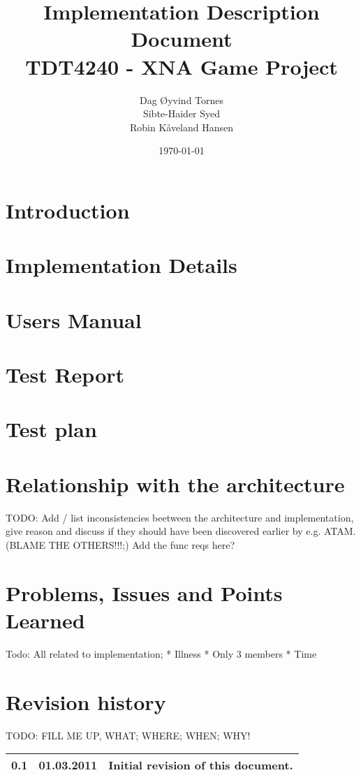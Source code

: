 \documentclass[titlepage,a4paper,11pt]{article}
\date{\today}
\begin{document}
\title{Implementation Description Document\\
 		TDT4240 - XNA Game Project}

\author{Dag Øyvind Tornes\\
 		Sibte-Haider Syed\\ 
		Robin Kåveland Hansen\\}
\maketitle

\pagestyle{empty}
\tableofcontents
\clearpage
\pagestyle{plain}

\section{Introduction}
	

\section{Implementation Details}
	
	
\section{Users Manual}
	
	
\section{Test Report}
	

\section{Test plan}
	
	
\section{Relationship with the architecture}
	TODO: Add / list inconsistencies beetween the architecture and implementation, give reason and discuss if they should
	have been discovered earlier by e.g. ATAM. (BLAME THE OTHERS!!!;)
	Add the func reqs here?
	
	
\section{Problems, Issues and Points Learned}
	Todo: All related to implementation; 
	* Illness
	* Only 3 members
	* Time

\section{Revision history}

TODO: FILL ME UP, WHAT; WHERE; WHEN; WHY!

\begin{table}[H]
  \begin{tabular}{| c | c | c |}
    \hline
    0.1 & 01.03.2011 & Initial revision of this document. \\
    \hline
  \end{tabular}
\end{table}
\end{document}
